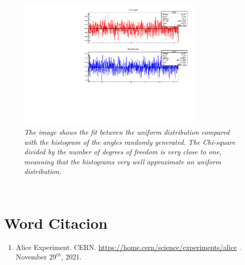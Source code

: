 \documentclass[a4paper, 11pt]{article}
\begin{document}
    \begin{figure}
      \includegraphics[width=9cm]{c2.pdf}
      \caption{\label{f1} \textit{The image shows the fit between the uniform distribution compared with the histogram of the angles randomly generated. The Chi-square divided by the number of degrees of freedom is very close to one, meanning that the histograms very well approximate an uniform distribution.}}
    \end{figure}
    \\
    \section* {Word Citacion}
    \begin{enumerate}
      \item{Alice Experiment. CERN. \url{https://home.cern/science/experiments/alice} . November $29^{th}$, 2021.}
    \end{enumerate}
\end{document}
